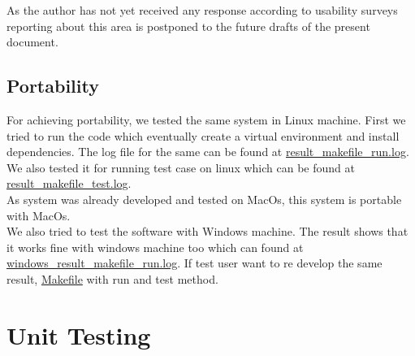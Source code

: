 \documentclass[12pt, titlepage]{article}
\begin{document}
    As the author has not yet received any response according to usability surveys reporting about this area is postponed to the future drafts of the present document. 


\subsection{Portability}

For achieving portability, we tested the same system in Linux machine. First we tried to run the code which eventually create a virtual environment and install dependencies. The log file for the same can be found at \href{https://github.com/DeeshaPatel/CAS-741-Solar-Cooker/blob/2ff9134d70eff6a26c63ebc68b9c41ecd9457917/test/Non%20Functional%20Requirement/portability/result_makefile_run.log}{result\_makefile\_run.log}. We also tested it for running test case on linux which can be found at \href{https://github.com/DeeshaPatel/CAS-741-Solar-Cooker/blob/2ff9134d70eff6a26c63ebc68b9c41ecd9457917/test/Non%20Functional%20Requirement/portability/result_makefile_test.log}{result\_makefile\_test.log}. \\ 

As system was already developed and tested on MacOs, this system is portable with MacOs. \\ 

We also tried to test the software with Windows machine. The result shows that it works fine with windows machine too which can found at \href{https://github.com/DeeshaPatel/CAS-741-Solar-Cooker/blob/e2f19bea9d6f072bada3125fc10d3e52e7bec8cc/test/Non%20Functional%20Requirement/portability/windows_result_makefile_run.log}{windows\_result\_makefile\_run.log}. If test user want to re develop the same result, \href{https://github.com/DeeshaPatel/CAS-741-Solar-Cooker/blob/e2f19bea9d6f072bada3125fc10d3e52e7bec8cc/src/Makefile}{Makefile} with run and test method.  


\section{Unit Testing}
\end{document}

